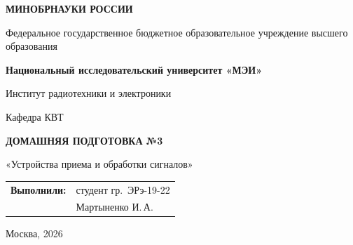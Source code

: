 \begin{titlepage}
    \centering
    {\bfseries МИНОБРНАУКИ РОССИИ\par}
    Федеральное государственное бюджетное образовательное учреждение высшего образования \\
    {\bfseries Национальный исследовательский университет «МЭИ»\par}
    \vspace{1cm}
    Институт радиотехники и электроники\par
    Кафедра КВТ\par
    \vspace{3cm}
    
    {\bfseries\large ДОМАШНЯЯ ПОДГОТОВКА №3\par}
    \vspace{0.5cm}
    {\large «Устройства приема и обработки сигналов»\par}
    
    \vspace{3.5cm}
 \vspace{1.5cm}
\noindent\hfill
\begin{tabular}{@{}ll@{}}
    \textbf{Выполнили:} & студент гр.~ЭРэ-19-22 \\
                        & Мартыненко И.\,А. \\
    
\end{tabular}   
    \vfill
    {Москва, 2026}
\end{titlepage}

